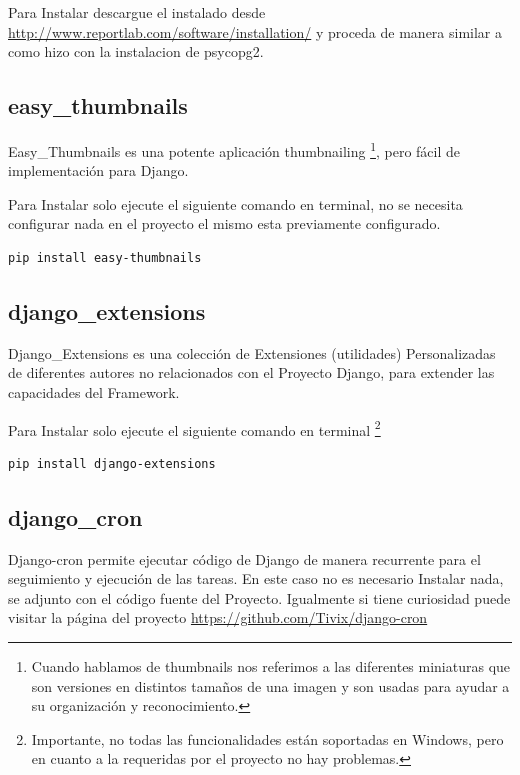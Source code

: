Para Instalar descargue el instalado desde \url{http://www.reportlab.com/software/installation/} y proceda de manera similar a como hizo con la instalacion de psycopg2.


\subsection{easy\_thumbnails}

Easy\_Thumbnails es una potente aplicación thumbnailing \footnote{Cuando hablamos de thumbnails nos referimos a las diferentes miniaturas que son versiones en distintos tamaños  de una imagen y son usadas para ayudar a su organización y reconocimiento.}, pero fácil de implementación para Django.

Para Instalar solo ejecute el siguiente comando en terminal, no se necesita configurar nada en el proyecto el mismo esta previamente configurado.

\begin{lstlisting}[style=consola]
    pip install easy-thumbnails
\end{lstlisting}
\vspace{0.1cm}

\subsection{django\_extensions}

Django\_Extensions es una colección de Extensiones (utilidades) Personalizadas de diferentes autores no relacionados con el Proyecto Django, para extender las capacidades del Framework.

Para Instalar solo ejecute el siguiente comando en terminal \footnote{Importante, no todas las funcionalidades están soportadas en Windows, pero en cuanto a la requeridas por el proyecto no hay problemas.}

\begin{lstlisting}[style=consola]
     pip install django-extensions
\end{lstlisting}
\vspace{0.1cm}


\subsection{django\_cron}

Django-cron permite ejecutar código de Django de manera recurrente para el seguimiento y ejecución de las tareas. En este caso no es necesario Instalar nada, se adjunto con el código fuente del Proyecto. Igualmente si tiene curiosidad puede visitar la página del proyecto \url{https://github.com/Tivix/django-cron}

